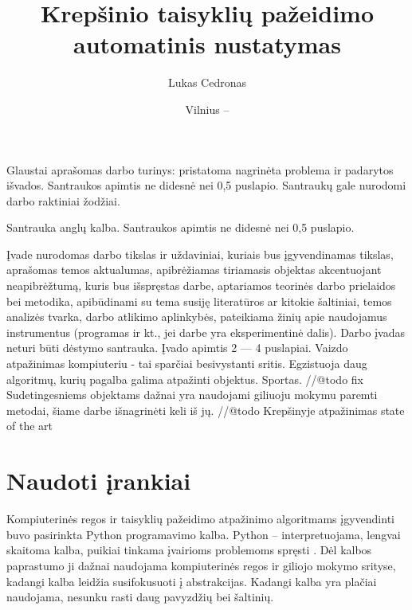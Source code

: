 \documentclass{VUMIFPSbakalaurinis}
\institute{Informatikos institutas}  %
\title{Krepšinio taisyklių pažeidimo automatinis nustatymas}
\author{Lukas Cedronas}
\date{Vilnius – \the\year}
\begin{document}
\maketitle


Glaustai aprašomas darbo turinys: pristatoma nagrinėta problema ir padarytos
išvados. Santraukos apimtis ne didesnė nei 0,5 puslapio. Santraukų gale
nurodomi darbo raktiniai žodžiai. 

Santrauka anglų kalba. Santraukos apimtis ne didesnė nei 0,5 puslapio.

\tableofcontents

Įvade nurodomas darbo tikslas ir uždaviniai, kuriais bus įgyvendinamas tikslas,
aprašomas temos aktualumas, apibrėžiamas tiriamasis objektas akcentuojant
neapibrėžtumą, kuris bus išspręstas darbe, aptariamos teorinės darbo prielaidos
bei metodika, apibūdinami su tema susiję literatūros ar kitokie šaltiniai,
temos analizės tvarka, darbo atlikimo aplinkybės, pateikiama žinių apie
naudojamus instrumentus (programas ir kt., jei darbe yra eksperimentinė dalis).
Darbo įvadas neturi būti dėstymo santrauka. Įvado apimtis 2 –– 4 puslapiai.
Vaizdo atpažinimas kompiuteriu - tai sparčiai besivystanti sritis. Egzistuoja daug algoritmų, kurių pagalba galima atpažinti objektus. Sportas. //@todo fix Sudetingesniems objektams dažnai yra naudojami giliuoju mokymu paremti metodai, šiame darbe išnagrinėti keli iš jų.  
//@todo Krepšinyje atpažinimas state of the art

\section{Naudoti įrankiai}

Kompiuterinės regos ir taisyklių pažeidimo atpažinimo algoritmams įgyvendinti buvo pasirinkta Python programavimo kalba. Python – interpretuojama, lengvai skaitoma kalba, puikiai tinkama įvairioms problemoms spręsti \cite{Python}. Dėl kalbos paprastumo ji dažnai naudojama kompiuterinės regos ir giliojo mokymo srityse, kadangi kalba leidžia susifokusuoti į abstrakcijas. Kadangi kalba yra plačiai naudojama, nesunku rasti daug pavyzdžių bei šaltinių. 
\end{document}
